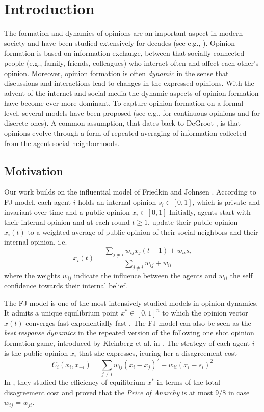 \section{Introduction}
The formation and dynamics of opinions are an important aspect in modern 
society and have been studied extensively for decades (see e.g., \cite{Jackson}).
Opinion formation is based on information exchange, between that socially 
connected people (e.g., family, friends, colleagues) who interact often 
and affect each other's opinion. Moreover, opinion
formation is often \emph{dynamic} in the sense that discussions and 
interactions lead to changes in the expressed opinions. With the 
advent of the internet and social media the dynamic aspects of 
opinion formation have become ever more dominant. To capture opinion formation 
on a formal level, several models have been proposed 
(see e.g., \cite{DeGroot,FJ90,HK,BKO11,GS14,BGM13} for 
continuous opinions and \cite{FGV12,YOASS13,BFM16} for discrete ones). 
A common assumption, that dates back to DeGroot \cite{DeGroot}, is 
that opinions evolve through a form of repeated averaging of 
information collected from the agent social neighborhoods.

\subsection{Motivation}
Our work builds on the influential model of Friedkin and
Johnsen \cite{FJ90}. According to FJ-model, each agent $i$ holds an 
internal opinion $s_i\in [0,1]$, which is private and
invariant over time and a public opinion $x_i \in [0,1]$
Initially, agents start with their internal opinion and at 
each round $t\geq1$, update their public opinion
$x_i(t)$ to a weighted average of public opinion of 
their social neighbors and their internal opinion, i.e.
\[x_i(t)= \frac{\sum_{j\neq i}w_{ij}x_j(t-1) + w_{ii}s_i}{\sum_{j\neq i}w_{ij}+w_{ii}}\]
where the weights $w_{ij}$ indicate the influence between
the agents and $w_{ii}$ the self confidence towards their 
internal belief. 

The FJ-model is one of the most intensively studied models
in opinion dynamics. It admits a 
unique equilibrium point $x^* \in [0,1]^n$ to which
the opinion vector $x(t)$ converges fast exponentially fast
\cite{GS14}. The FJ-model can also be seen as the \emph{best response
dynamics} in the repeated version of the following one shot
opinion formation game, introduced by Kleinberg et al. in \cite{BKO11}. 
The strategy of each agent $i$ is the public opinion $x_i$ that she expresses,
icuring her a disagreement cost \[C_i(x_i,x_{-i})=\sum_{j \neq i}w_{ij}(x_i-x_j)^2 + w_{ii}(x_i-s_i)^2\]
In \cite{BKO11}, they studied the efficiency of equilibrium $x^*$ in terms
of the total disagreement cost and proved that the 
\emph{Price of Anarchy} is at most $9/8$ in case $w_{ij}=w_{ji}$.

